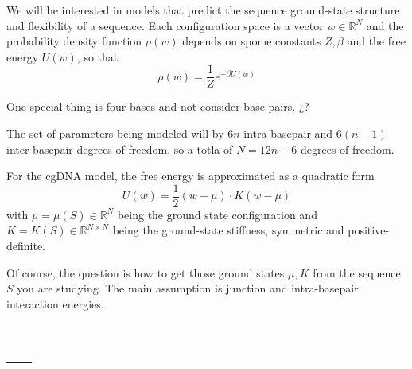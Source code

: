 \documentclass[palatino]{epflnotes}
\begin{document}
We will be interested in models that predict the sequence ground-state structure and flexibility of a sequence. Each configuration space is a vector $w ∈ ℝ^N$ and the probability density function $ρ(w)$ depends on spome constants $Z,β$ and the free energy $U(w)$, so that \[ ρ(w) = \frac{1}{Z} e^{-βU(w)} \]

One special thing is four bases and not consider base pairs. ¿?

The set of parameters being modeled will by $6n$ intra-basepair and $6(n-1)$ inter-basepair degrees of freedom, so a totla of $N = 12n - 6$ degrees of freedom.

For the cgDNA model, the free energy is approximated as a quadratic form \[ U(w)= \frac{1}{2} (w - μ) · K(w -μ)\] with $μ = μ(S) ∈ ℝ^N$ being the ground state configuration and $K = K(S) ∈ ℝ^{N×N}$ being the ground-state stiffness, symmetric and positive-definite.

Of course, the question is how to get those ground states $μ, K$ from the sequence $S$ you are studying. The main assumption is junction and intra-basepair interaction energies.

\appendix

\chapter{---}

\backmatter
\printindex
\end{document}
